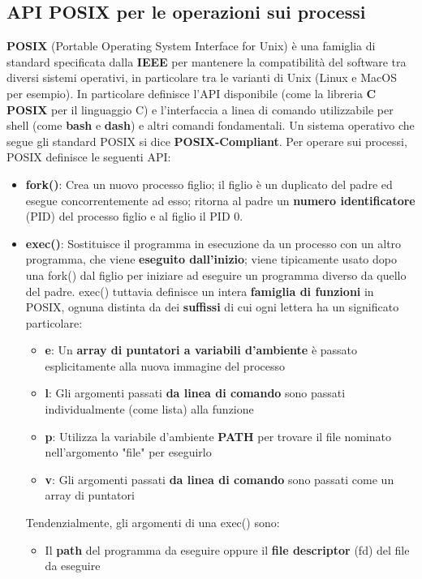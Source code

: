 \documentclass[12pt]{article}
\begin{document}
\subsection{API POSIX per le operazioni sui processi}
\textbf{POSIX} (Portable Operating System Interface for Unix) è una famiglia di standard specificata dalla \textbf{IEEE} per mantenere la compatibilità del software tra diversi sistemi operativi,
in particolare tra le varianti di Unix (Linux e MacOS per esempio). In particolare definisce l'API disponibile (come la libreria \textbf{C POSIX} per il linguaggio C) e l'interfaccia a linea di comando
utilizzabile per shell (come \textbf{bash} e \textbf{dash}) e altri comandi fondamentali.
Un sistema operativo che segue gli standard POSIX si dice \textbf{POSIX-Compliant}.
Per operare sui processi, POSIX definisce le seguenti API:
\begin{itemize}
    \item \textbf{fork()}: Crea un nuovo processo figlio; il figlio è un duplicato del padre ed esegue concorrentemente ad esso; ritorna al padre un \textbf{numero identificatore} (PID) del processo figlio e al figlio il PID 0.
    \item \textbf{exec()}: Sostituisce il programma in esecuzione da un processo con un altro programma, che viene \textbf{eseguito dall'inizio}; viene tipicamente usato dopo una fork() dal figlio per iniziare ad eseguire un programma diverso da quello del padre.
    exec() tuttavia definisce un intera \textbf{famiglia di funzioni} in POSIX, ognuna distinta da dei \textbf{suffissi} di cui ogni lettera ha un significato particolare:
    \begin{itemize}
        \item \textbf{e}: Un \textbf{array di puntatori a variabili d'ambiente} è passato esplicitamente alla nuova immagine del processo
        \item \textbf{l}: Gli argomenti passati \textbf{da linea di comando} sono passati individualmente (come lista) alla funzione
        \item \textbf{p}: Utilizza la variabile d'ambiente \textbf{PATH} per trovare il file nominato nell'argomento "file" per eseguirlo
        \item \textbf{v}: Gli argomenti passati \textbf{da linea di comando} sono passati come un array di puntatori
    \end{itemize}
    Tendenzialmente, gli argomenti di una exec() sono:
    \begin{itemize}
        \item Il \textbf{path} del programma da eseguire oppure il \textbf{file descriptor} (fd) del file da eseguire

\end{itemize}
\end{itemize}
\end{document}
